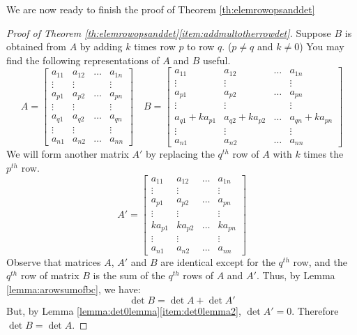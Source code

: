 \documentclass{ximera}
\begin{document}
We are now ready to finish the proof of Theorem \ref{th:elemrowopsanddet}
\begin{proof}[Proof of Theorem \ref{th:elemrowopsanddet}\ref{item:addmultotherrowdet}]
Suppose $B$ is obtained from $A$ by adding $k$ times row $p$ to row $q$.  ($p\neq q$ and $k\neq 0$)  You may find the following representations of $A$ and $B$ useful.
$$A=\begin{bmatrix} a_{11} & a_{12} & \dots  & a_{1n}  \\
   \vdots & \vdots &  & \vdots \\
   a_{p1} & a_{p2} &\dots  & a_{pn}  \\
   \vdots & \vdots &  & \vdots \\
   a_{q1} & a_{q2} &\dots  & a_{qn}  \\
   \vdots & \vdots &  & \vdots  \\
   a_{n1} & a_{n2} & \dots  & a_{nn}\end{bmatrix}\quad
   B=\begin{bmatrix} a_{11} & a_{12} & \dots  & a_{1n}  \\
   \vdots & \vdots &  & \vdots \\
   a_{p1} & a_{p2} & \dots  & a_{pn}  \\
   \vdots & \vdots &  & \vdots \\
   a_{q1}+ka_{p1} & a_{q2}+ka_{p2} &\dots  & a_{qn}+ka_{pn}  \\
   \vdots & \vdots &  & \vdots  \\
   a_{n1} & a_{n2} & \dots  & a_{nn}\end{bmatrix}$$
We will form another matrix $A'$ by replacing the $q^{th}$ row of $A$ with $k$ times the $p^{th}$ row.
$$A'=\begin{bmatrix} a_{11} & a_{12} & \dots  & a_{1n}  \\
   \vdots & \vdots &  & \vdots \\
   a_{p1} & a_{p2} &\dots  & a_{pn}  \\
   \vdots & \vdots &  & \vdots \\
   ka_{p1} & ka_{p2} &\dots  & ka_{pn}  \\
   \vdots & \vdots &  & \vdots  \\
   a_{n1} & a_{n2} & \dots  & a_{nn}\end{bmatrix}$$
Observe that matrices $A$, $A'$ and $B$ are identical except for the $q^{th}$ row, and the $q^{th}$ row of matrix $B$ is the sum of the $q^{th}$ rows of $A$ and $A'$.  Thus, by Lemma \ref{lemma:arowsumofbc}, we have:
$$\det{B}=\det{A}+\det{A'}$$
But, by Lemma \ref{lemma:det0lemma}\ref{item:det0lemma2}, 
$\det{A'}=0$. Therefore 
$\det{B}=\det{A}$.
   
\end{proof}
\end{document}
